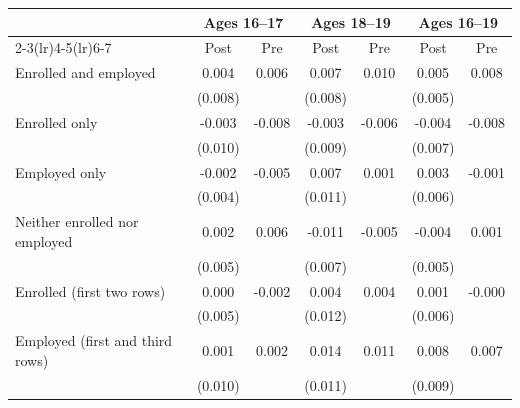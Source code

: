 \begin{tabular}{lcccccc}
\toprule
 & \multicolumn{2}{c}{Ages 16--17} & \multicolumn{2}{c}{Ages 18--19} & \multicolumn{2}{c}{Ages 16--19} \\
\cmidrule(lr){2-3}\cmidrule(lr){4-5}\cmidrule(lr){6-7}
 & Post & Pre & Post & Pre & Post & Pre \\
\midrule
Enrolled and employed & 0.004 & 0.006 & 0.007 & 0.010 & 0.005 & 0.008 \\
 & (0.008) &  & (0.008) &  & (0.005) &  \\
Enrolled only & -0.003 & -0.008 & -0.003 & -0.006 & -0.004 & -0.008 \\
 & (0.010) &  & (0.009) &  & (0.007) &  \\
Employed only & -0.002 & -0.005 & 0.007 & 0.001 & 0.003 & -0.001 \\
 & (0.004) &  & (0.011) &  & (0.006) &  \\
Neither enrolled nor employed & 0.002 & 0.006 & -0.011 & -0.005 & -0.004 & 0.001 \\
 & (0.005) &  & (0.007) &  & (0.005) &  \\
Enrolled (first two rows) & 0.000 & -0.002 & 0.004 & 0.004 & 0.001 & -0.000 \\
 & (0.005) &  & (0.012) &  & (0.006) &  \\
Employed (first and third rows) & 0.001 & 0.002 & 0.014 & 0.011 & 0.008 & 0.007 \\
 & (0.010) &  & (0.011) &  & (0.009) &  \\
\bottomrule
\end{tabular}
